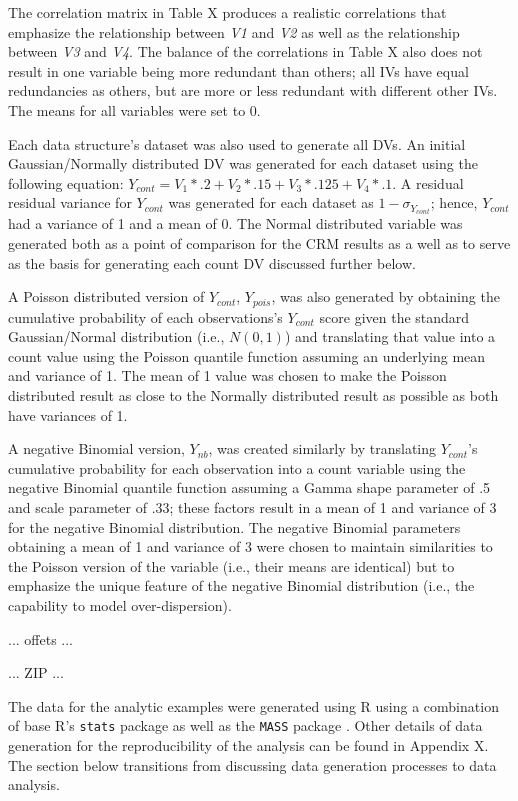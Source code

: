 \documentclass[ShortAfour,times,sageapa]{sagej}
\begin{document}
	\medskip
	
	The correlation matrix in Table X produces a realistic correlations that emphasize the relationship between \emph{V1} and \emph{V2} as well as the relationship between \emph{V3} and \emph{V4}.  
	The balance of the correlations in Table X also does not result in one variable being more redundant than others; all IVs have equal redundancies as others, but are more or less redundant with different other IVs.	The means for all variables were set to 0.
	
	Each data structure's dataset was also used to generate all DVs.  An initial Gaussian/Normally distributed DV was generated for each dataset using the following equation: $Y_{cont} = V_1*.2 + V_2*.15 + V_3*.125 + V_4*.1$.  A residual residual variance for $Y_{cont}$ was generated for each dataset as $1 - \sigma_{Y_{cont}}$; hence, $Y_{cont}$ had a variance of 1 and a mean of 0.  
	The Normal distributed variable was generated both as a point of comparison for the CRM results as a well as to serve as the basis for generating each count DV discussed further below.
	
	A Poisson distributed version of $Y_{cont}$, $Y_{pois}$, was also generated by obtaining the cumulative probability of each observations's $Y_{cont}$ score given the standard Gaussian/Normal distribution (i.e., $N(0,1)$) and translating that value into a count value using the Poisson quantile function assuming an underlying mean and variance of 1.  
	The mean of 1 value was chosen to make the Poisson distributed result as close to the Normally distributed result as possible as both have variances of 1.	
	
	A negative Binomial version, $Y_{nb}$, was created similarly by translating $Y_{cont}$'s cumulative probability for each observation into a count variable using the negative Binomial quantile function assuming a Gamma shape parameter of .5 and scale parameter of .33; these factors result in a mean of 1 and variance of 3 for the negative Binomial distribution.  
	The negative Binomial parameters obtaining a mean of 1 and variance of 3 were chosen to maintain similarities to the Poisson version of the variable (i.e., their means are identical) but to emphasize the unique feature of the negative Binomial distribution (i.e., the capability to model over-dispersion).  
	
	... offets ...
	
	... ZIP ...
	
	The data for the analytic examples were generated using R \cite{R} using a combination of base R's \texttt{stats} package as well as the \texttt{MASS} package \cite{MASS}.  
	Other details of data generation for the reproducibility of the analysis can be found in Appendix X.  
	The section below transitions from discussing data generation processes to data analysis.
	
\end{document}
